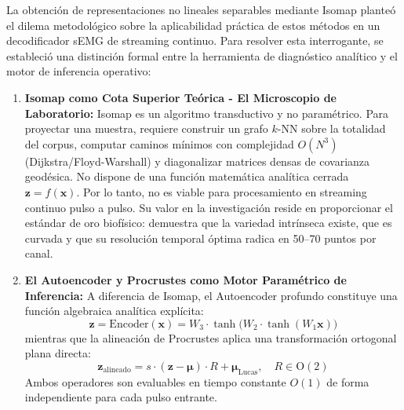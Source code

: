 \documentclass[11pt,a4paper,openany]{book}
\theoremstyle{definition}
\begin{document}
La obtención de representaciones no lineales separables mediante Isomap planteó el dilema metodológico sobre la aplicabilidad práctica de estos métodos en un decodificador sEMG de streaming continuo. Para resolver esta interrogante, se estableció una distinción formal entre la herramienta de diagnóstico analítico y el motor de inferencia operativo:
\begin{enumerate}
    \item \textbf{Isomap como Cota Superior Teórica - El Microscopio de Laboratorio:}
    Isomap es un algoritmo transductivo y no paramétrico. Para proyectar una muestra, requiere construir un grafo $k$-NN sobre la totalidad del corpus, computar caminos mínimos con complejidad $O(N^3)$ (Dijkstra/Floyd-Warshall) y diagonalizar matrices densas de covarianza geodésica. No dispone de una función matemática analítica cerrada $\mathbf{z} = f(\mathbf{x})$. Por lo tanto, no es viable para procesamiento en streaming continuo pulso a pulso. Su valor en la investigación reside en proporcionar el estándar de oro biofísico: demuestra que la variedad intrínseca existe, que es curvada y que su resolución temporal óptima radica en 50--70 puntos por canal.
    \item \textbf{El Autoencoder y Procrustes como Motor Paramétrico de Inferencia:}
    A diferencia de Isomap, el Autoencoder profundo constituye una función algebraica analítica explícita:
    \begin{equation}
        \mathbf{z} = \text{Encoder}(\mathbf{x}) = W_3 \cdot \tanh\big(W_2 \cdot \tanh(W_1 \mathbf{x})\big)
    \end{equation}
    mientras que la alineación de Procrustes aplica una transformación ortogonal plana directa:
    \begin{equation}
        \mathbf{z}_{\text{alineado}} = s \cdot (\mathbf{z} - \boldsymbol{\mu}) \cdot R + \boldsymbol{\mu}_{\text{Lucas}}, \quad R \in \text{O}(2)
    \end{equation}
    Ambos operadores son evaluables en tiempo constante $O(1)$ de forma independiente para cada pulso entrante.
\end{enumerate}
\end{document}
